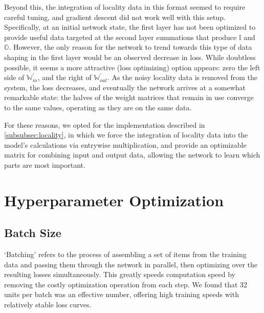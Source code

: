 Beyond this, the integration of locality data in this format seemed to require 
careful tuning, and gradient descent did not work well with this setup.  
Specifically, at an initial network state, the first layer has not been 
optimized to provide useful data targeted at the second layer summations that 
produce $\mathbb{I}$ and $\mathbb{O}$. However, the only reason for the network 
to trend towards this type of data shaping in the first layer would be an 
observed decrease in loss. While doubtless possible, it seems a more attractive 
(loss optimizing) option appears: zero the left side of 
$\mathbb{W}_{in}^\prime$, and the right of $\mathbb{W}_{out}^\prime$. As the 
noisy locality data is removed from the system, the loss decreases, and 
eventually the network arrives at a somewhat remarkable state: the halves of the 
weight matrices that remain in use converge to the same values, operating as 
they are on the same data.

For these reasons, we opted for the implementation described in 
\ref{subsubsec:locality}, in which we force the integration of locality data 
into the model's calculations via entrywise multiplication, and provide an 
optimizable matrix for combining input and output data, allowing the network to 
learn which parts are most important.

\section{Hyperparameter Optimization}
\subsection{Batch Size}
`Batching' refers to the process of assembling a set of items from the training 
data and passing them through the network in parallel, then optimizing over the 
resulting losses simultaneously. This greatly speeds computation speed by 
removing the costly optimization operation from each step. We found that 32 
units per batch was an effective number, offering high training speeds with 
relatively stable loss curves.
